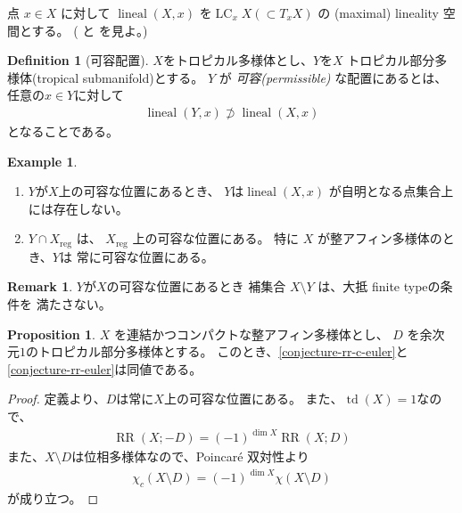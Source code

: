 \documentclass[a4paper,dvipdfmx,reqno,12pt]{amsart}
\theoremstyle{definition}
\newtheorem{definition}[theorem]{Definition}
\newtheorem{example}[theorem]{Example}
\newtheorem{proposition}[theorem]{Proposition}
\newtheorem{remark}[theorem]{Remark}
\newcommand{\opn}[1]{\operatorname{#1}}
\numberwithin{equation}{section}
\begin{document}
点 $x\in X$ に対して
$\opn{lineal}(X,x)$ を$\opn{LC}_x X (\subset T_x X)$
の (maximal) lineality 空間とする。
(\cite[]{MR4246795} と
\cite[]{demedrano2023chern} を見よ。)

\begin{definition}[{可容配置}]
\label{definition-permissible-position}
$X$をトロピカル多様体とし、$Y$を$X$
トロピカル部分多様体(tropical submanifold)とする。
$Y$ が \emph{可容(permissible)} な配置にあるとは、
任意の$x\in Y$に対して
\begin{align}
     \opn{lineal}(Y,x)\not \supset \opn{lineal}(X,x)
\end{align}
となることである。
\end{definition}

\begin{example}
\begin{enumerate}
\item $Y$が$X$上の可容な位置にあるとき、
$Y$は$\opn{lineal}(X,x)$
が自明となる点集合上には存在しない。
\item $Y\cap X_{\mathrm{reg}}$ は、
$X_{\mathrm{reg}}$ 上の可容な位置にある。
特に $X$ が整アフィン多様体のとき、$Y$は
常に可容な位置にある。
\end{enumerate}

\end{example}

\begin{remark}
$Y$が$X$の可容な位置にあるとき
補集合 $X\setminus Y$ は、大抵 finite typeの条件を
満たさない。
\end{remark}

\begin{proposition}
$X$ を連結かつコンパクトな整アフィン多様体とし、
$D$ を余次元$1$のトロピカル部分多様体とする。
このとき、\cref{conjecture-rr-c-euler}と
\cref{conjecture-rr-euler}は同値である。
\end{proposition}
\begin{proof}
定義より、$D$は常に$X$上の可容な位置にある。
また、$\opn{td}(X)=1$なので、
\begin{align}
\opn{RR}(X;-D)=(-1)^{\dim X}\opn{RR}(X;D)
\end{align}
また、$X\setminus D$は位相多様体なので、Poincar\'e 双対性より
\begin{align}
\chi_c(X\setminus D)=(-1)^{\dim X}\chi(X\setminus D)
\end{align}
が成り立つ。
\end{proof}
\end{document}
